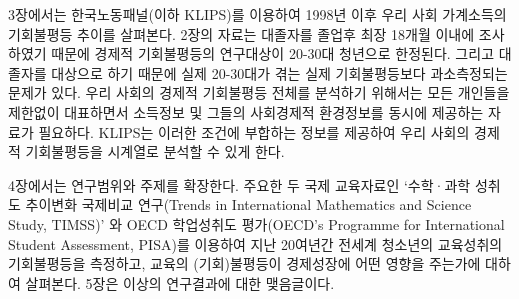 3장에서는 한국노동패널(이하 KLIPS)를 이용하여 1998년 이후 우리 사회 가계소득의 기회불평등 추이를 살펴본다. 2장의 자료는 대졸자를 졸업후 최장 18개월 이내에 조사하였기 때문에 경제적 기회불평등의 연구대상이 20-30대 청년으로 한정된다. 그리고 대졸자를 대상으로 하기 때문에 실제 20-30대가 겪는 실제 기회불평등보다 과소측정되는 문제가 있다. 우리 사회의 경제적 기회불평등 전체를 분석하기 위해서는 모든 개인들을 제한없이 대표하면서 소득정보 및 그들의 사회경제적 환경정보를 동시에 제공하는 자료가 필요하다. KLIPS는 이러한 조건에 부합하는 정보를 제공하여 우리 사회의 경제적 기회불평등을 시계열로 분석할 수 있게 한다.

4장에서는 연구범위와 주제를 확장한다.  주요한 두 국제 교육자료인 `수학·과학 성취도 추이변화 국제비교 연구(Trends in International Mathematics and Science Study, TIMSS)' 와 OECD 학업성취도 평가(OECD's Programme for International Student Assessment, PISA)를 이용하여 지난 20여년간 전세계 청소년의 교육성취의 기회불평등을 측정하고, 교육의 (기회)불평등이 경제성장에 어떤 영향을 주는가에 대하여 살펴본다.
5장은 이상의 연구결과에 대한 맺음글이다.
